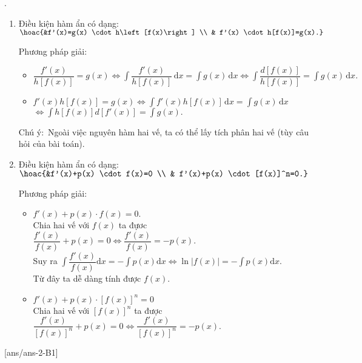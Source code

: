 \begin{dang}{.}
\begin{enumerate}
		
\item[1.]  Điều kiện hàm ẩn có dạng$\colon $ $\hoac{&f'(x)=g(x) \cdot h\left[f(x)\right] \\ & f'(x) \cdot h[f(x)]=g(x).}$

Phương pháp giải$\colon $
	\begin{itemize}
	\item $\dfrac{f'(x)}{h[f(x)]}=g(x) \Leftrightarrow \displaystyle\int \dfrac{f'(x)}{h[f(x)]} \mathrm{\,d}x=\displaystyle\int g(x) \mathrm{\,d}x \Leftrightarrow \displaystyle\int \dfrac{d[f(x)]}{h[f(x)]}=\displaystyle\int g(x)\mathrm{\,d}x.$
	\item $f'(x) h[f(x)]=g(x) \Leftrightarrow \displaystyle\int f'(x) h[f(x)] \mathrm{\,d}x=\displaystyle\int g(x)\mathrm{\,d}x$\\$ \Leftrightarrow \displaystyle\int h[f(x)]  d\left[f'(x)\right]=\displaystyle\int g(x).$
	\end{itemize}
Chú ý$\colon$ Ngoài việc nguyên hàm hai vế, ta có thể lấy tích phân hai vế (tùy câu hỏi của bài toán).\\
\item[2.] Điều kiện hàm ẩn có dạng$\colon $ $\hoac{&f'(x)+p(x) \cdot f(x)=0 \\ & f'(x)+p(x) \cdot[f(x)]^n=0.}$

Phương pháp giải$\colon $
\begin{itemize}
	\item $f'(x)+p(x) \cdot f(x)=0.$\\
Chia hai vế với $f(x)$ ta đựơc $\dfrac{f'(x)}{f(x)}+p(x)=0 \Leftrightarrow \dfrac{f'(x)}{f(x)}=-p(x).$\\
Suy ra $\displaystyle\int \dfrac{f'(x)}{f(x)} \mathrm{d} x=-\displaystyle\int p(x) \mathrm{d} x \Leftrightarrow \ln |f(x)|=-\displaystyle\int p(x) \mathrm{d} x$.\\
Từ đây ta dễ dàng tính được $f(x).$
	\item $f'(x)+p(x) \cdot[f(x)]^n=0$\\
Chia hai vế với $[f(x)]^n$ ta được $\dfrac{f'(x)}{[f(x)]^n}+p(x)=0 \Leftrightarrow \dfrac{f'(x)}{[f(x)]^n}=-p(x).$
\end{itemize}
\end{enumerate}
\end{dang}
[ans/ans-2-B1]
\TN  
